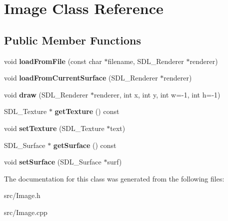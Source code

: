 \hypertarget{classImage}{}\section{Image Class Reference}
\label{classImage}
\subsection*{Public Member Functions}
\begin{DoxyCompactItemize}
\item 
\mbox{\label{classImage_aa276b5183099671ddeaf8f083068046c}} 
void {\bfseries load\+From\+File} (const char $\ast$filename, S\+D\+L\+\_\+\+Renderer $\ast$renderer)
\item 
\mbox{\label{classImage_aee71e67e123b6fdd1d3c91caa2892792}} 
void {\bfseries load\+From\+Current\+Surface} (S\+D\+L\+\_\+\+Renderer $\ast$renderer)
\item 
\mbox{\label{classImage_a82d6936d466ba0161d8b9cbacf613de5}} 
void {\bfseries draw} (S\+D\+L\+\_\+\+Renderer $\ast$renderer, int x, int y, int w=-\/1, int h=-\/1)
\item 
\mbox{\label{classImage_ae9e27e310b4322d04366f2882f3a4242}} 
S\+D\+L\+\_\+\+Texture $\ast$ {\bfseries get\+Texture} () const
\item 
\mbox{\label{classImage_a35722a34cb7cb630da1c1cbcb8a596fc}} 
void {\bfseries set\+Texture} (S\+D\+L\+\_\+\+Texture $\ast$text)
\item 
\mbox{\label{classImage_a1083bd04d7fa7074dc0ff15f5ab98e71}} 
S\+D\+L\+\_\+\+Surface $\ast$ {\bfseries get\+Surface} () const
\item 
\mbox{\label{classImage_a833f5d3b4b9f905320c6dffcc9b84b95}} 
void {\bfseries set\+Surface} (S\+D\+L\+\_\+\+Surface $\ast$surf)
\end{DoxyCompactItemize}


The documentation for this class was generated from the following files\+:\begin{DoxyCompactItemize}
\item 
src/Image.\+h\item 
src/Image.\+cpp\end{DoxyCompactItemize}
